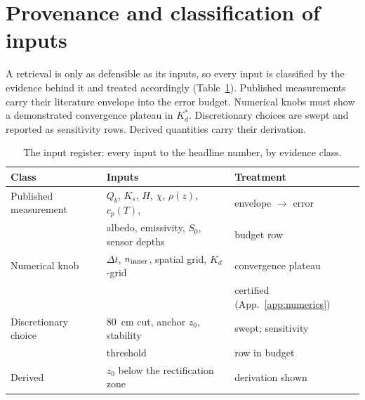 \documentclass[11pt,a4paper,oneside]{report}
\newcommand{\Kd}{\ensuremath{K_d}}
\newcommand{\Kds}{\ensuremath{K_d^{*}}}
\newcommand{\Ks}{\ensuremath{K_s}}
\newcommand{\Qb}{\ensuremath{Q_b}}
\begin{document}
\section{Provenance and classification of inputs}\label{sec:register}
A retrieval is only as defensible as its inputs, so every input is
classified by the evidence behind it and treated accordingly
(Table~\ref{tab:register}). Published measurements carry their
literature envelope into the error budget. Numerical knobs must show
a demonstrated convergence plateau in \Kds. Discretionary choices are
swept and reported as sensitivity rows. Derived quantities carry
their derivation.

\begin{table}[htbp]
  \centering\small
  \caption{The input register: every input to the headline number, by
  evidence class.}
  \label{tab:register}
  \begin{tabular}{lll}
    \toprule
    Class & Inputs & Treatment \\
    \midrule
    Published measurement & \Qb, \Ks, $H$, $\chi$, $\rho(z)$, $c_p(T)$, & envelope $\to$ error \\
      & albedo, emissivity, $S_0$, sensor depths & budget row \\
    Numerical knob & $\Delta t$, $n_{\rm inner}$, spatial grid, \Kd-grid & convergence plateau \\
      & & certified (App.~\ref{app:numerics}) \\
    Discretionary choice & $80$~cm cut, anchor $z_0$, stability & swept; sensitivity \\
      & threshold & row in budget \\
    Derived & $z_0$ below the rectification zone & derivation shown \\
    \bottomrule
  \end{tabular}
\end{table}
\end{document}
